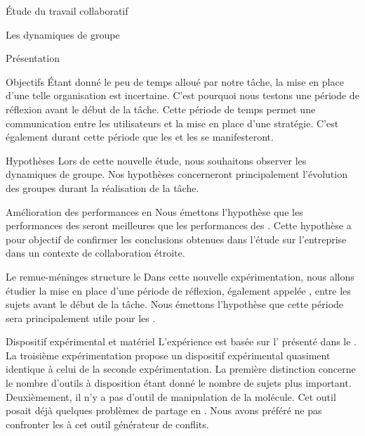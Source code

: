 \documentclass[myfrancais]{mythesis}
\begin{document}
\begin{mypart}{Étude du travail collaboratif}
\begin{mychapter}{Les dynamiques de groupe}
\begin{mysection}{Présentation}
\begin{mysubsection}{Objectifs}
					Étant donné le peu de temps alloué par notre tâche, la mise en place d'une telle organisation est incertaine.
					C'est pourquoi nous testons une période de réflexion avant le début de la tâche.
					Cette période de temps permet une communication entre les utilisateurs et la mise en place d'une stratégie.
					C'est également durant cette période que les  et les  se manifesteront.
				\end{mysubsection}
				\begin{mysubsection}{Hypothèses}
					Lors de cette nouvelle étude, nous souhaitons observer les dynamiques de groupe.
					Nos hypothèses concerneront principalement l'évolution des groupes durant la réalisation de la tâche.
					\begin{myparagraph}{ Amélioration des performances en }
						Nous émettons l'hypothèse que les performances des  seront meilleures que les performances des .
						Cette hypothèse a pour objectif de confirmer les conclusions obtenues dans l'étude sur l'entreprise \myHawthorne dans un contexte de collaboration étroite.
					\end{myparagraph}
					\begin{myparagraph}{ Le remue-méninges structure le }
						Dans cette nouvelle expérimentation, nous allons étudier la mise en place d'une période de réflexion, également appelée , entre les sujets avant le début de la tâche.
						Nous émettons l'hypothèse que cette période sera principalement utile pour les .
					\end{myparagraph}
				\end{mysubsection}
			\end{mysection}
			\begin{mysection}{Dispositif expérimental et matériel}
				L'expérience est basée sur l' présenté dans le .
				La troisième expérimentation propose un dispositif expérimental quasiment identique à celui de la seconde expérimentation.
				La première distinction concerne le nombre d'outils à disposition étant donné le nombre de sujets plus important.
				Deuxièmement, il n'y a pas d'outil de manipulation de la molécule.
				Cet outil posait déjà quelques problèmes de partage en .
				Nous avons préféré ne pas confronter les  à cet outil générateur de conflits.


\end{mysection}
\end{mychapter}
\end{mypart}
\end{document}
